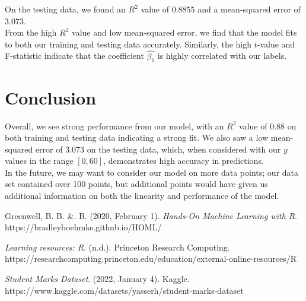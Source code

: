 \documentclass{article}
\begin{document}
\noindent On the testing data, we found an $R^2$ value of $0.8855$ and a mean-squared error of $3.073$. \\

\noindent From the high $R^2$ value and low mean-squared error, we find that the model fits to both our training and testing data accurately. Similarly, the high $t$-value and F-statistic indicate that the coefficient $\hat{\beta_1}$ is highly correlated with our labels.

\section{Conclusion}

Overall, we see strong performance from our model, with an $R^2$ value of 0.88 on both training and testing data indicating a strong fit. We also saw a low mean-squared error of 3.073 on the testing data, which, when considered with our $y$ values in the range $[0,60]$, demonstrates high accuracy in predictions. \\

\noindent In the future, we may want to consider our model on more data points; our data set contained over 100 points, but additional points would have given us additional information on both the linearity and performance of the model.\textbf{}

\begin{thebibliography}{9}

Greenwell, B. B. \&. B. (2020, February 1). \emph{Hands-On Machine Learning with R}\textbf{}. https://bradleyboehmke.github.io/HOML/

\emph{Learning resources: R}. (n.d.). Princeton Research Computing. https://researchcomputing.princeton.edu/education/external-online-resources/R


\emph{Student Marks Dataset}. (2022, January 4). Kaggle. https://www.kaggle.com/datasets/yasserh/student-marks-dataset


\end{thebibliography}
\end{document}
